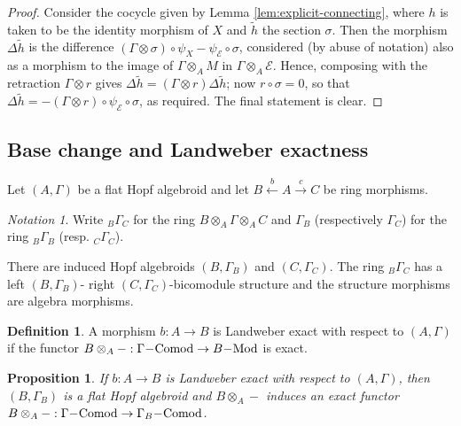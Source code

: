 \documentclass[10pt,a4paper]{amsart}
\newtheorem{prop}[thm]{Proposition}
\theoremstyle{definition}
\newtheorem{defn}[thm]{Definition}
\theoremstyle{remark}
\newtheorem{nota}[thm]{Notation}
\newcommand{\dash}{\hspace{-.2em}-\hspace{-.2em}}
\newcommand{\BGammaC}{{_B\Gamma_C}}
\newcommand{\modules}{\mathrm{Mod}}
\newcommand{\comod}{\mathrm{Comod}}
\begin{document}
\begin{proof}
Consider the cocycle given by Lemma \ref{lem:explicit-connecting}, where $h$ is taken
to be the identity morphism of $X$ and $\tilde{h}$ the section $\sigma$. Then the
morphism $\Delta \tilde{h}$ is the difference $(\Gamma \otimes \sigma) \circ \psi_X - \psi_{\mathcal{E}} \circ \sigma$, considered (by abuse of notation)
also as a morphism to the image of $\Gamma \otimes_A M$ in $\Gamma \otimes_A \mathcal{E}$. Hence, composing with the retraction $\Gamma \otimes r$ gives $\Delta \tilde{h}=(\Gamma \otimes r) \Delta \tilde{h}$; now $r \circ \sigma =0$,  so that $\Delta \tilde{h} = -( \Gamma \otimes r) \circ \psi _{\mathcal{E}} \circ \sigma$, as required. The final statement is clear.
\end{proof}





\subsection{Base change and Landweber exactness}
\label{sect:cocycle-basechange}

Let $(A, \Gamma)$ be a flat Hopf algebroid and let $B
\stackrel{b}{\leftarrow} A \stackrel{c}{\rightarrow }C$ be ring morphisms.

\begin{nota}
	Write $\BGammaC$ for the ring $B \otimes _A \Gamma \otimes _A C$
 and  $\Gamma_B$ (respectively $\Gamma_C$) for the ring $ _B\Gamma_B$ (resp. $_C \Gamma _C$).
\end{nota}



There are induced Hopf algebroids $(B, \Gamma_B)$ and $(C, \Gamma_C)$.
	The ring $_B\Gamma_C$ has a left  $(B,\Gamma_B)$- right $(C,
\Gamma_C)$-bicomodule structure and the structure morphisms are
algebra morphisms.



\begin{defn}\cite{HS_comod}
\label{def:Landweber_exact}
A  morphism $b : A \rightarrow B$ is Landweber
exact with respect to $(A,\Gamma)$ if the functor $B\otimes_A - : \Gamma \dash \comod
\rightarrow B \dash \modules$ is exact.
\end{defn}


\begin{prop}
	\cite{HS_comod}
	If $b : A  \rightarrow B$ is Landweber exact with respect to $(A, \Gamma)$, then $(B, \Gamma_B)$ is a flat Hopf algebroid and $B \otimes_A -$ induces an exact functor $B\otimes_A - : \Gamma \dash \comod
\rightarrow \Gamma_B \dash \comod$.
\end{prop}
\end{document}
